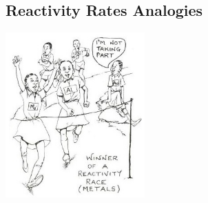 \begin{multicols}{2}
\subsection{Reactivity Rates Analogies}

\begin{center}
\includegraphics[width=0.4\textwidth]{./img/source/reactivity-race.jpg}
\end{center}


\vfill
\columnbreak


\end{multicols}
